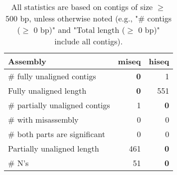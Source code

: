 \documentclass[12pt,a4paper]{article}
\begin{document}
\begin{table}[ht]
\begin{center}
\caption{All statistics are based on contigs of size $\geq$ 500 bp, unless otherwise noted (e.g., "\# contigs ($\geq$ 0 bp)" and "Total length ($\geq$ 0 bp)" include all contigs).}
\begin{tabular}{|l*{2}{|r}|}
\hline
Assembly & miseq & hiseq \\ \hline
\# fully unaligned contigs & {\bf 0} & 1 \\ \hline
Fully unaligned length & {\bf 0} & 551 \\ \hline
\# partially unaligned contigs & 1 & {\bf 0} \\ \hline
\hspace{5mm}\# with misassembly & 0 & 0 \\ \hline
\hspace{5mm}\# both parts are significant & 0 & 0 \\ \hline
Partially unaligned length & 461 & {\bf 0} \\ \hline
\# N's & 51 & {\bf 0} \\ \hline
\end{tabular}
\end{center}
\end{table}
\end{document}
